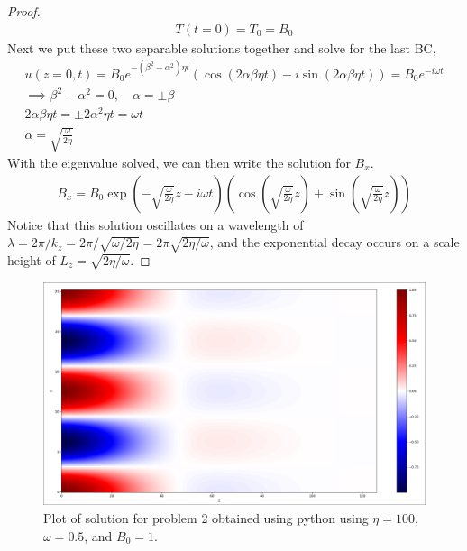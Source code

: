 \documentclass{article}
\begin{document}
\begin{proof}
\begin{gather*}
        T(t=0) = T_0 = B_0
    \end{gather*}
    Next we put these two separable solutions together and solve for the last
    BC,
    \begin{gather*}
        u(z=0,t) = B_0e^{-(\beta^2-\alpha^2)\eta t}\left(\cos(2\alpha\beta\eta t)
        - i\sin(2\alpha\beta\eta t)\right) = B_0e^{-i\omega t} \\
        \implies \beta^2 - \alpha^2 = 0, \quad \alpha = \pm \beta \\
        2\alpha\beta\eta t = \pm 2\alpha^2\eta t = \omega t\\
        \alpha = \sqrt{\frac{\omega}{2\eta}}
    \end{gather*}
    With the eigenvalue solved, we can then write the solution for $B_x$. 
    \begin{gather*}
        B_x = B_0\exp\left(-\sqrt{\frac{\omega}{2\eta}}z - i\omega
        t\right)\left(\cos\left(\sqrt{\frac{\omega}{2\eta}}z\right) + 
        \sin\left(\sqrt{\frac{\omega}{2\eta}}z\right)\right)
    \end{gather*}
    Notice that this solution oscillates on a wavelength of $\lambda = 2\pi/k_z =
    2\pi/\sqrt{\omega/2\eta} = 2\pi\sqrt{2\eta/\omega}$, and the exponential
    decay occurs on a scale height of $L_z = \sqrt{2\eta/\omega}$. 
\end{proof}

\begin{figure}
    \centering
    \includegraphics[width=1\textwidth]{hw1p5_plot.png}
    \caption{Plot of solution for problem 2 obtained using python using $\eta =
    100$, $\omega = 0.5$, and $B_0 = 1$.}
\end{figure}
\end{document}

